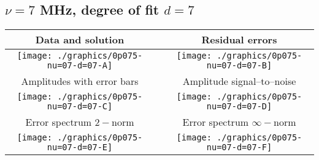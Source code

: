 

% 

\clearpage{}
\break{}

\subsection{$\nu = 7$ MHz, degree of fit $d = 7$}

\begin{table}[h]
    \begin{center}
        \begin{tabular}{ccc}
            Data and solution & \quad & Residual errors \\\hline
            \texttt{[image: ./graphics/0p075-nu=07-d=07-A]} &&
            \texttt{[image: ./graphics/0p075-nu=07-d=07-B]} \\[15pt]
            Amplitudes with error bars && Amplitude signal--to--noise \\\hline
            \texttt{[image: ./graphics/0p075-nu=07-d=07-C]} &&
            \texttt{[image: ./graphics/0p075-nu=07-d=07-D]} \\[15pt]
            Error spectrum $2-$norm && Error spectrum $\infty-$norm \\\hline
            \texttt{[image: ./graphics/0p075-nu=07-d=07-E]} &&
            \texttt{[image: ./graphics/0p075-nu=07-d=07-F]} \\[15pt]
        \end{tabular}
    \end{center}
\label{fig:elev=75, nu=7}
\end{table}



\endinput
